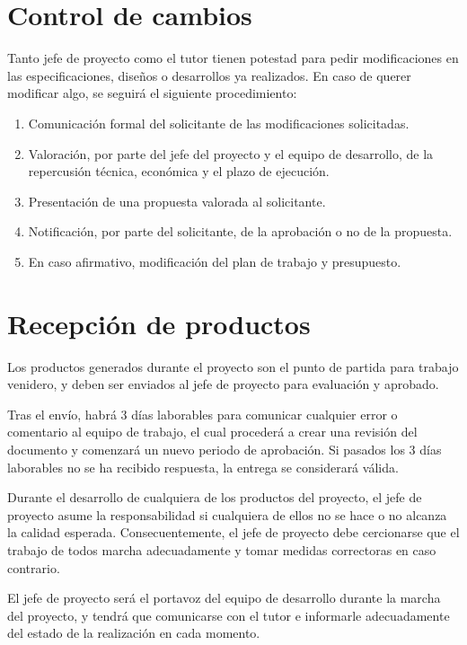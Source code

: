 \section{Control de cambios}

Tanto jefe de proyecto como el tutor tienen potestad para pedir modificaciones en las 	especificaciones, diseños o desarrollos ya realizados. En caso de querer modificar algo, se 	seguirá el siguiente procedimiento:

\begin{enumerate}
	\item Comunicación formal del solicitante de las modificaciones solicitadas.
	\item Valoración, por parte del jefe del proyecto y el equipo de desarrollo, de la repercusión 	técnica, económica y el plazo de ejecución.
	\item Presentación de una propuesta valorada al solicitante.
	\item Notificación, por parte del solicitante, de la aprobación o no de la propuesta.
	\item En caso afirmativo, modificación del plan de trabajo y presupuesto.
\end{enumerate}

\section{Recepción de productos}

Los productos generados durante el proyecto son el punto de partida para trabajo venidero, y deben ser enviados al jefe de proyecto para evaluación y aprobado.

Tras el envío, habrá 3 días laborables para comunicar cualquier error o comentario al equipo de trabajo, el cual procederá a crear una revisión del documento y comenzará un nuevo periodo de aprobación. Si pasados los 3 días laborables no se ha recibido respuesta, la entrega se considerará válida.

Durante el desarrollo de cualquiera de los productos del proyecto, el jefe de proyecto asume 	la responsabilidad si cualquiera de ellos no se hace o no alcanza la calidad esperada. 	Consecuentemente, el jefe de proyecto debe cercionarse que el trabajo de todos marcha 	adecuadamente y tomar medidas correctoras en caso contrario.

El jefe de proyecto será el portavoz del equipo de desarrollo durante la marcha del proyecto, 	y tendrá que comunicarse con el tutor e informarle adecuadamente del estado de la 	realización en cada momento.

